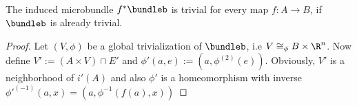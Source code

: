 \\ The induced microbundle $f^*\bundleb$ is trivial for every map $f: A \to B$, if $\bundleb$ is already trivial.
\begin{proof}
Let $(V, \phi)$ be a global trivialization of $\bundleb$, i.e $V \cong_\phi B \times \R^n$. Now define $V' := (A \times V) \cap E'$ and $\phi'(a, e) := (a, \phi^{(2)}(e))$. Obviously, $V'$ is a neighborhood of $i'(A)$ and also $\phi'$ is a homeomorphism with inverse $\phi'^{(-1)}(a, x) = (a, \phi^{-1}(f(a), x))$
\end{proof}